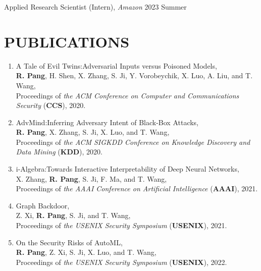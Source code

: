 \documentclass[letterpaper,11pt]{article}
\begin{document}
\noindent
Applied Research Scientist (Intern), \textit{Amazon}  \hfill 2023 Summer


\section{PUBLICATIONS}

\begin{enumerate}[labelsep=15pt, parsep=-4pt]

    \item A Tale of Evil Twins:\@ Adversarial Inputs versus Poisoned Models,\\
    \textbf{R. Pang}, H. Shen, X. Zhang, S. Ji, Y. Vorobeychik, X. Luo, A. Liu, and T. Wang,\\
    Proceedings of {\it the ACM Conference on Computer and Communications Security\/} (\textbf{CCS}), 2020.
    
    \item AdvMind:\@ Inferring Adversary Intent of Black-Box Attacks,\\
    \textbf{R. Pang}, X. Zhang, S. Ji, X. Luo, and T. Wang,\\
    Proceedings of {\it the ACM SIGKDD Conference on Knowledge Discovery and Data Mining\/} (\textbf{KDD}), 2020.
    
    \item i-Algebra:\@ Towards Interactive Interpretability of Deep Neural Networks,\\
    X. Zhang, \textbf{R. Pang}, S. Ji, F. Ma, and T. Wang,\\
    Proceedings of {\it the AAAI Conference on Artificial Intelligence\/} (\textbf{AAAI}), 2021.
    
    \item Graph Backdoor,\\
    Z. Xi, \textbf{R. Pang}, S. Ji, and T. Wang,\\
    Proceedings of {\it the USENIX Security Symposium\/} (\textbf{USENIX}), 2021.
    
    \item On the Security Risks of AutoML,\\
    \textbf{R. Pang}, Z. Xi, S. Ji, X. Luo, and T. Wang,\\
    Proceedings of {\it the USENIX Security Symposium\/} (\textbf{USENIX}), 2022.
    

\end{enumerate}
\end{document}
